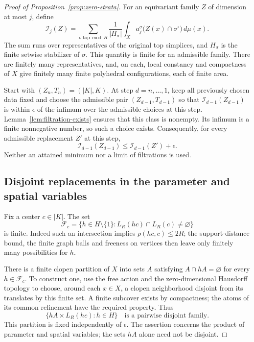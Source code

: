 \begin{proof}[Proof of Proposition~\ref{prop:zero-strata}]
For an equivariant family $Z$ of dimension at most $j$, define
\begin{equation}\label{eq:normalized-area}
 \mathcal I_j(Z)=
 \sum_{\sigma\ \mathrm{top}\bmod H}\frac{1}{|H_\sigma|}
 \int_X a_j^\sigma\bigl(Z(x)\cap\sigma^\circ\bigr)\,d\mu(x).
\end{equation}
The sum runs over representatives of the original top simplices, and
$H_\sigma$ is the finite setwise stabilizer of $\sigma$.  This quantity is
finite for an admissible family.  There are finitely many representatives,
and, on each, local constancy and compactness of $X$ give finitely many
finite polyhedral configurations, each of finite area.

Start with $(Z_n,T_n)=(|K|,K)$.  At step $d=n,\ldots,1$, keep all previously
chosen data fixed and choose the admissible pair $(Z_{d-1},T_{d-1})$ so that
$\mathcal I_{d-1}(Z_{d-1})$ is within $\epsilon$ of the infimum over the
admissible choices at this step.  Lemma~\ref{lem:filtration-exists} ensures
that this class is nonempty.  Its infimum is a finite nonnegative number,
so such a choice exists.  Consequently, for every admissible replacement
$Z'$ at this step,
\begin{equation}\label{eq:near-minimality}
 \mathcal I_{d-1}(Z_{d-1})
 \le \mathcal I_{d-1}(Z')+\epsilon.
\end{equation}
Neither an attained minimum nor a limit of filtrations is used.

\subsection{Disjoint replacements in the parameter and spatial variables}

Fix a center $c\in|K|$.  The set
\[
 \mathcal F_c=
 \{h\in H\setminus\{1\}:L_R(hc)\cap L_R(c)\ne\varnothing\}
\]
is finite.  Indeed such an intersection implies $\rho(hc,c)\le2R$;
the support-distance bound, the finite graph balls and freeness on vertices
then leave only finitely many possibilities for $h$.

There is a finite clopen partition of $X$ into sets $A$ satisfying
$A\cap hA=\varnothing$ for every $h\in\mathcal F_c$.  To construct one,
use the free action and the zero-dimensional Hausdorff topology to choose,
around each $x\in X$, a clopen neighborhood disjoint from its translates
by this finite set.  A finite subcover exists by compactness; the atoms of
its common refinement have the required property.  Thus
\begin{equation}\label{eq:product-disjointness}
 \{hA\times L_R(hc):h\in H\}
 \quad\text{is a pairwise disjoint family.}
\end{equation}
This partition is fixed independently of $\epsilon$.  The assertion
concerns the product of parameter and spatial variables; the sets $hA$
alone need not be disjoint.


\end{proof}
